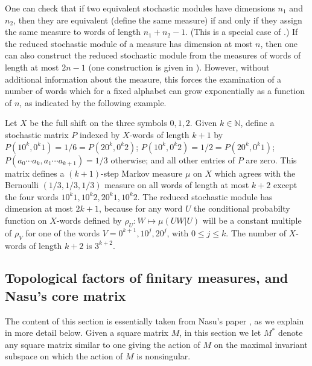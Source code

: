 \documentclass{kepart2010}
\theoremstyle{plain}
\theoremstyle{definition}
\theoremstyle{remark}
\theoremstyle{definition}
\numberwithin{equation}{section}
\begin{document}
One can  check that
if  two equivalent stochastic modules have dimensions $n_1$ and $n_2$,
then they are equivalent (define the same measure) if and only if
they assign the same measure to words of length $n_1 + n_2 -1$.
(This is a special
case of \cite[Theorem 5.2]{InagakiFutumuraMutuura1972}.)
If the reduced stochastic module of a measure has dimension at
most $n$, then one can also construct the reduced stochastic
module from the measures of words of length at most $2n-1$
(one construction is given in
\cite[Theorem 6.2]{InagakiFutumuraMutuura1972}). However, without
additional information about the measure, this forces
the examination of a number of words which for a fixed
alphabet can grow exponentially
as a function of $n$, as indicated by the following example.
\begin{ex}
Let $X$ be the full shift on the three symbols $0,1,2$. Given $k\in
\mathbb N$, define a stochastic matrix $P$ indexed by $X$-words of
length $k+1$ by $P(10^k,0^k1)=1/6=P(20^k,0^k2)$;
$P(10^k,0^k2)=1/2=P(20^k,0^k1)$; $P(a_0\cdots a_{k},  a_1\cdots
a_{k+1}) =1/3$ otherwise; and all other entries  of $P$ are zero.
This matrix defines a $(k+1)$-step Markov measure $\mu$ on $X$ which
agrees with the Bernoulli $(1/3,1/3,1/3)$ measure on all words of
length at most $k+2$ except  the four words
$10^k1,10^k2,20^k1,10^k2$. The reduced stochastic module has
dimension at most $2k+1$, because for any word $U$ the conditional
probabilty function on $X$-words defined by $\rho_U: W\mapsto \mu
(UW|U)$ will be a constant multiple of $\rho_V$ for one of  the
words  $V= 0^{k+1},10^j, 20^j$, with $0\leq j \leq k$. The number of
$X$-words of length $k+2$ is  $3^{k+2}$.
\end{ex}

\subsection{Topological factors of finitary measures, and Nasu's
core matrix}
\label{remark_nasucore}

The content of this section is essentially taken from Nasu's paper
\cite{Nasu1985}, as we explain in more detail below. Given a square
matrix $M$, in this section we let $M^*$ denote any square matrix
similar to one giving the action of $M$ on the maximal invariant
subspace on which the action of $M$ is nonsingular.
\end{document}
